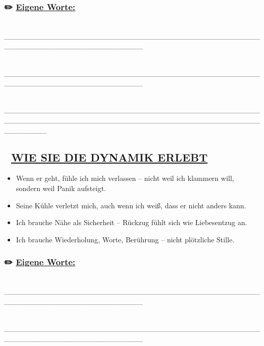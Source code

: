 \hypertarget{eigene-worte}{%
\subsubsection{\texorpdfstring{✏️ \textbf{\ul{Eigene Worte:}}}{✏️ Eigene Worte:}}\label{eigene-worte}}

📝 \_\_\_\_\_\_\_\_\_\_\_\_\_\_\_\_\_\_\_\_\_\_\_\_\_\_\_\_\_\_\_\_\_\_\_\_\_\_\_\_\_\_\_\_\_\_\_\_\_\_\_\_\_\_\_\_\_\_\_\_\_\_\_\_\_\_\_\_\_\_\_\_\_\_

📝 \_\_\_\_\_\_\_\_\_\_\_\_\_\_\_\_\_\_\_\_\_\_\_\_\_\_\_\_\_\_\_\_\_\_\_\_\_\_\_\_\_\_\_\_\_\_\_\_\_\_\_\_\_\_\_\_\_\_\_\_\_\_\_\_\_\_\_\_\_\_\_\_\_\_

📝 \_\_\_\_\_\_\_\_\_\_\_\_\_\_\_\_\_\_\_\_\_\_\_\_\_\_\_\_\_\_\_\_\_\_\_\_\_\_\_\_\_\_\_\_\_\_\_\_\_\_\_\_\_\_\_\_\_\_\_\_\_\_\_\_\_\_\_\_\_\_\_\_\_\_\_\_\_\_\_\_\_\_\_\_\_\_\_\_\_\_\_\_\_\_\_\_\_\_\_\_\_\_\_\_

\hypertarget{wie-sie-die-dynamik-erlebt}{%
\subsection{\texorpdfstring{🧩 \textbf{\ul{WIE SIE DIE DYNAMIK ERLEBT}}}{🧩 WIE SIE DIE DYNAMIK ERLEBT}}\label{wie-sie-die-dynamik-erlebt}}

\begin{itemize}
\tightlist
\item
  Wenn er geht, fühle ich mich verlassen -- nicht weil ich klammern will, sondern weil Panik aufsteigt.
\item
  Seine Kühle verletzt mich, auch wenn ich weiß, dass er nicht anders kann.
\item
  Ich brauche Nähe als Sicherheit -- Rückzug fühlt sich wie Liebesentzug an.
\item
  Ich brauche Wiederholung, Worte, Berührung -- nicht plötzliche Stille.
\end{itemize}

\hypertarget{eigene-worte-1}{%
\subsubsection{\texorpdfstring{✏️ \textbf{\ul{Eigene Worte:}}}{✏️ Eigene Worte:}}\label{eigene-worte-1}}

📝 \_\_\_\_\_\_\_\_\_\_\_\_\_\_\_\_\_\_\_\_\_\_\_\_\_\_\_\_\_\_\_\_\_\_\_\_\_\_\_\_\_\_\_\_\_\_\_\_\_\_\_\_\_\_\_\_\_\_\_\_\_\_\_\_\_\_\_\_\_\_\_\_\_\_

📝 \_\_\_\_\_\_\_\_\_\_\_\_\_\_\_\_\_\_\_\_\_\_\_\_\_\_\_\_\_\_\_\_\_\_\_\_\_\_\_\_\_\_\_\_\_\_\_\_\_\_\_\_\_\_\_\_\_\_\_\_\_\_\_\_\_\_\_\_\_\_\_\_\_\_

